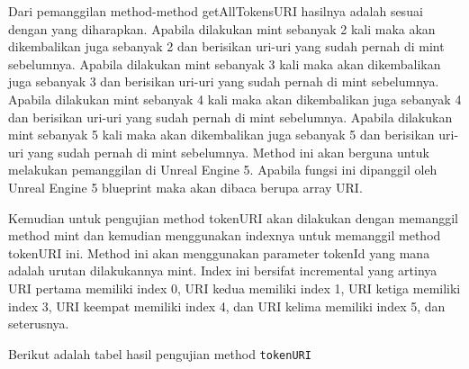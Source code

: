 Dari pemanggilan method-method getAllTokensURI hasilnya adalah sesuai dengan yang diharapkan. Apabila dilakukan mint sebanyak 2 kali maka akan dikembalikan juga sebanyak 2 dan berisikan uri-uri yang sudah pernah di mint sebelumnya.
Apabila dilakukan mint sebanyak 3 kali maka akan dikembalikan juga sebanyak 3 dan berisikan uri-uri yang sudah pernah di mint sebelumnya.
Apabila dilakukan mint sebanyak 4 kali maka akan dikembalikan juga sebanyak 4 dan berisikan uri-uri yang sudah pernah di mint sebelumnya.
Apabila dilakukan mint sebanyak 5 kali maka akan dikembalikan juga sebanyak 5 dan berisikan uri-uri yang sudah pernah di mint sebelumnya.
Method ini akan berguna untuk melakukan pemanggilan di Unreal Engine 5.
Apabila fungsi ini dipanggil oleh Unreal Engine 5 blueprint maka akan dibaca berupa array URI.

Kemudian untuk pengujian method tokenURI akan dilakukan dengan memanggil method mint dan kemudian menggunakan indexnya untuk memanggil  method tokenURI ini. Method ini akan
menggunakan parameter tokenId yang mana adalah urutan dilakukannya mint. Index ini bersifat incremental yang artinya URI pertama memiliki index 0, URI kedua memiliki index 1,
URI ketiga memiliki index 3, URI keempat memiliki index 4, dan URI kelima memiliki index 5, dan seterusnya.

Berikut adalah tabel hasil pengujian method \texttt{tokenURI}

